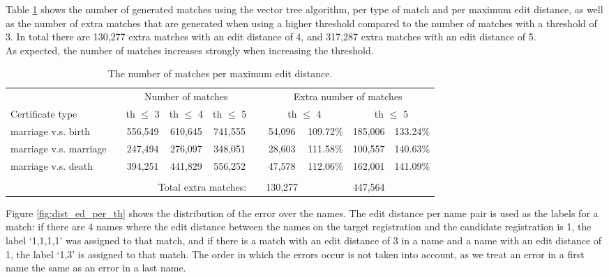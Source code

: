 Table \ref{tab:NumberOfMatches} shows the number of generated matches using the vector tree algorithm, per type of match and per maximum edit distance, as well as the number of extra matches that are generated when using a higher threshold compared to the number of matches with a threshold of 3. In total there are 130,277 extra matches with an edit distance of 4, and 317,287 extra matches with an edit distance of 5.\\
As expected, the number of matches increases strongly when increasing the threshold. 
 
 \begin{table}[ht]
 	\centering
 	\caption[Number of matches of vectortree per maximum edit distance]{The number of matches per maximum edit distance.\label{tab:NumberOfMatches}}
 	\begin{tabular}{llccclcccc}
 		\toprule
 		&& \multicolumn{3}{c}{Number of matches} && \multicolumn{4}{c}{Extra number of matches}\\
 		\cmidrule{3-5} \cmidrule{7-10}
 		Certificate type		&& th $\leq$ 3 & th $\leq$ 4 & th $\leq$ 5 && \multicolumn{2}{c}{th $\leq$ 4} & \multicolumn{2}{c}{th $\leq$ 5} \\
 		\cmidrule{1-1}\cmidrule{3-5} \cmidrule{7-10}	
 		marriage v.s. birth 	&& 556,549 & 610,645 & 741,555 && 54,096 & 109.72\% & 185,006 & 133.24\% \\
 		marriage v.s. marriage	&& 247,494 & 276,097 & 348,051 && 28,603 & 111.58\% & 100,557 & 140.63\% \\
 		marriage v.s. death 	&& 394,251 & 441,829 & 556,252 && 47,578 & 112.06\% & 162,001 & 141.09\% \\
 		\bottomrule\\
 		\multicolumn{5}{r}{Total extra matches:} && 130,277 & & 447,564 &\\
 		\bottomrule
 	\end{tabular}
 	
 \end{table}
 
Figure \ref{fig:dist_ed_per_th} shows the distribution of the error over the names. The edit distance per name pair is used as the labels for a match: if there are 4 names where the edit distance between the names on the target registration and the candidate registration is 1, the label `1,1,1,1' was assigned to that match, and if there is a match with an edit distance of 3 in a name and a name with an edit distance of 1, the label `1,3' is assigned to that match. The order in which the errors occur is not taken into account, as we treat an error in a first name the same as an error in a last name.\newline

